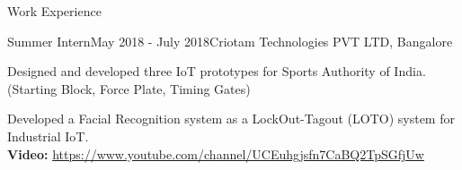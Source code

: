 \documentclass{resume} %
\begin{document}
\begin{rSection}{Work Experience}
\begin{rSubsection}{Summer Intern}{May 2018 - July 2018}{Criotam Technologies PVT LTD, Bangalore}{}{}
				\item Designed and developed three IoT prototypes for Sports Authority of India. (Starting Block, Force Plate, Timing Gates)
				\item Developed a Facial Recognition system as a LockOut-Tagout (LOTO)
				system for Industrial IoT. \\
				\textbf{Video:} \url{https://www.youtube.com/channel/UCEuhgjsfn7CaBQ2TpSGfjUw}
		
		\end{rSubsection}
		
	\end{rSection}
	
	
	
	
\end{document}
